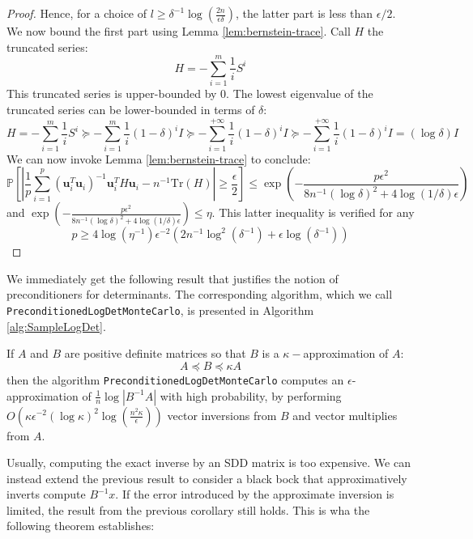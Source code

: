 \begin{proof}
Hence, for a choice of $l\geq\delta^{-1}\log\left(\frac{2n}{\epsilon\delta}\right)$,
the latter part is less than $\epsilon/2$. We now bound the first
part using Lemma \ref{lem:bernstein-trace}. Call $H$ the truncated
series: 
\[
H=-\sum_{i=1}^{m}\frac{1}{i}S^{i}
\]
This truncated series is upper-bounded by $0$. The lowest eigenvalue
of the truncated series can be lower-bounded in terms of $\delta$:
\[
H=-\sum_{i=1}^{m}\frac{1}{i}S^{i}\succeq-\sum_{i=1}^{m}\frac{1}{i}\left(1-\delta\right)^{i}I\succeq-\sum_{i=1}^{+\infty}\frac{1}{i}\left(1-\delta\right)^{i}I\succeq-\sum_{i=1}^{+\infty}\frac{1}{i}\left(1-\delta\right)^{i}I=\left(\log\delta\right)I
\]
We can now invoke Lemma \ref{lem:bernstein-trace} to conclude: 
\[
\mathbb{P}\left[\left|\frac{1}{p}\sum_{i=1}^{p}\left(\mathbf{u}_{i}^{T}\mathbf{u}_{i}\right)^{-1}\mathbf{u}_{i}^{T}H\mathbf{u}_{i}-n^{-1}\mbox{Tr}\left(H\right)\right|\geq\frac{\epsilon}{2}\right]\leq\exp\left(-\frac{p\epsilon^{2}}{8n^{-1}\left(\log\delta\right)^{2}+4\log\left(1/\delta\right)\epsilon}\right)
\]
and $\exp\left(-\frac{p\epsilon^{2}}{8n^{-1}\left(\log\delta\right)^{2}+4\log\left(1/\delta\right)\epsilon}\right)\leq\eta$.
This latter inequality is verified for any 
\[
p\geq4\log\left(\eta^{-1}\right)\epsilon^{-2}\left(2n^{-1}\log^{2}\left(\delta^{-1}\right)+\epsilon\log\left(\delta^{-1}\right)\right)
\]


\end{proof} We immediately get the following result that justifies
the notion of preconditioners for determinants. The corresponding
algorithm, which we call \texttt{PreconditionedLogDetMonteCarlo},
is presented in Algorithm \ref{alg:SampleLogDet}.

\begin{corollary} \label{cor:preconditioning}If $A$ and $B$ are
positive definite matrices so that $B$ is a $\kappa-$approximation
of $A$: 
\begin{equation}
A\preceq B\preceq\kappa A\label{eq:A-B-bounds}
\end{equation}
then the algorithm \texttt{PreconditionedLogDetMonteCarlo} computes
an $\epsilon$-approximation of $\frac{1}{n}\log\left|B^{-1}A\right|$
with high probability, by performing $O\left(\kappa\epsilon^{-2}\left(\log\kappa\right)^{2}\log\left(\frac{n^{2}\kappa}{\epsilon}\right)\right)$
vector inversions from $B$ and vector multiplies from $A$.

\end{corollary}

Usually, computing the exact inverse by an SDD matrix is too expensive.
We can instead extend the previous result to consider a black bock
that approximatively inverts compute $B^{-1}x$. If the error introduced
by the approximate inversion is limited, the result from the previous
corollary still holds. This is wha the following theorem establishes:

